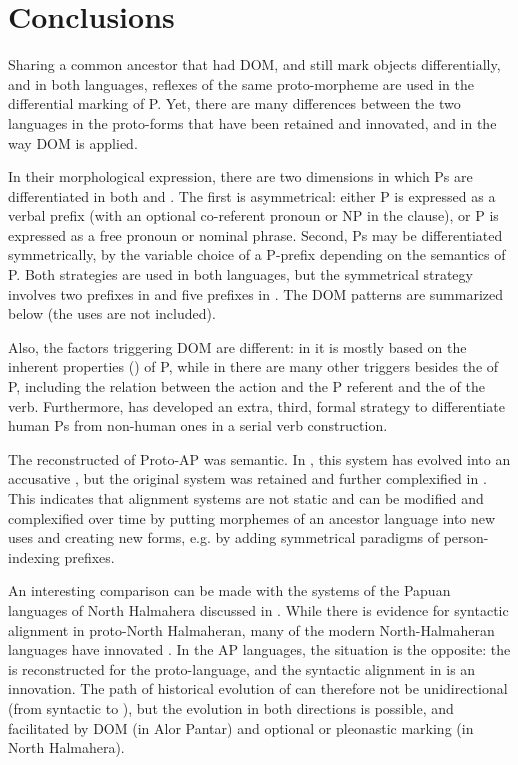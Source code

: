 \documentclass[output=paper]{LSP/langsci}
\begin{document}
\section{Conclusions}
\label{03-kl-sec:6}
Sharing a common ancestor that had DOM,  and  still mark objects differentially, and in both languages, reflexes of the same proto-morpheme are used in the differential marking of P. Yet, there are many differences between the two languages in the proto-forms that have been retained and innovated, and in the way DOM is applied.

In their morphological expression, there are two dimensions in which Ps are differentiated in both  and . The first is asymmetrical: either P is expressed as a verbal prefix (with an optional co-referent pronoun or NP in the clause), or P is expressed as a free pronoun or nominal phrase. Second, Ps may be differentiated symmetrically, by the variable choice of a P-prefix depending on the semantics of P. Both strategies are used in both languages, but the symmetrical strategy involves two prefixes in  and five prefixes in . The DOM patterns are summarized below (the  uses are not included).


Also, the factors triggering DOM are different: in  it is mostly based on the inherent properties () of P, while in  there are many other triggers besides the  of P, including the  relation between the action and the P referent and the  of the verb. Furthermore,  has developed an extra, third, formal strategy to differentiate human Ps from non-human ones in a serial verb construction. 

The reconstructed  of Proto-AP was semantic. In , this system has evolved into an accusative , but the original system was retained and further complexified in . This indicates that alignment systems are not static and can be modified and complexified over time by putting morphemes of an ancestor language into new uses and creating new forms, e.g. by adding symmetrical paradigms of person-indexing prefixes.

An interesting comparison can be made with the  systems of the Papuan languages of North Halmahera discussed in \citet{Holton2008}. While there is evidence for syntactic alignment in proto-North Halmaheran, many of the modern North-Halmaheran languages have innovated  \citep[274--275]{Holton2008}. In the AP languages, the situation is the opposite: the  is reconstructed for the proto-language, and the syntactic alignment in  is an innovation. The path of historical evolution of  can therefore not be unidirectional (from syntactic to ), but the evolution in both directions is possible, and facilitated by DOM (in Alor Pantar) and optional or pleonastic marking (in North Halmahera).
\end{document}
